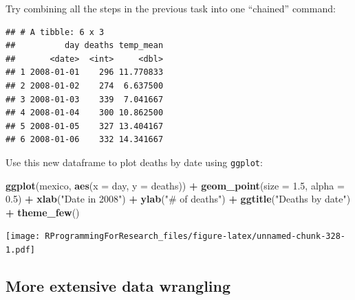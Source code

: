 \documentclass[]{book}
\makeatletter
\newenvironment{Shaded}{\begin{snugshade}}{\end{snugshade}}
\newcommand{\KeywordTok}[1]{\textcolor[rgb]{0.13,0.29,0.53}{\textbf{#1}}}
\newcommand{\DataTypeTok}[1]{\textcolor[rgb]{0.13,0.29,0.53}{#1}}
\newcommand{\FloatTok}[1]{\textcolor[rgb]{0.00,0.00,0.81}{#1}}
\newcommand{\StringTok}[1]{\textcolor[rgb]{0.31,0.60,0.02}{#1}}
\newcommand{\OperatorTok}[1]{\textcolor[rgb]{0.81,0.36,0.00}{\textbf{#1}}}
\newcommand{\NormalTok}[1]{#1}
\newenvironment{kframe}{%
\medskip{}
\setlength{\fboxsep}{.8em}
 \def\at@end@of@kframe{}%
 \ifinner\ifhmode%
  \def\at@end@of@kframe{\end{minipage}}%
  \begin{minipage}{\columnwidth}%
 \fi\fi%
 \def\FrameCommand##1{\hskip\@totalleftmargin \hskip-\fboxsep
 \colorbox{shadecolor}{##1}\hskip-\fboxsep
     \hskip-\linewidth \hskip-\@totalleftmargin \hskip\columnwidth}%
 \MakeFramed {\advance\hsize-\width
   \@totalleftmargin\z@ \linewidth\hsize
   \@setminipage}}%
 {\par\unskip\endMakeFramed%
 \at@end@of@kframe}
\renewenvironment{Shaded}{\begin{kframe}}{\end{kframe}}
\theoremstyle{definition}
\theoremstyle{definition}
\theoremstyle{definition}
\theoremstyle{remark}
\makeatother
\begin{document}
Try combining all the steps in the previous task into one ``chained''
command:

\begin{Shaded}
\end{Shaded}

\begin{verbatim}
## # A tibble: 6 x 3
##          day deaths temp_mean
##       <date>  <int>     <dbl>
## 1 2008-01-01    296 11.770833
## 2 2008-01-02    274  6.637500
## 3 2008-01-03    339  7.041667
## 4 2008-01-04    300 10.862500
## 5 2008-01-05    327 13.404167
## 6 2008-01-06    332 14.341667
\end{verbatim}

Use this new dataframe to plot deaths by date using \texttt{ggplot}:

\begin{Shaded}
\begin{Highlighting}[]
\KeywordTok{ggplot}\NormalTok{(mexico, }\KeywordTok{aes}\NormalTok{(}\DataTypeTok{x =}\NormalTok{ day, }\DataTypeTok{y =}\NormalTok{ deaths)) }\OperatorTok{+}\StringTok{ }
\StringTok{        }\KeywordTok{geom_point}\NormalTok{(}\DataTypeTok{size =} \FloatTok{1.5}\NormalTok{, }\DataTypeTok{alpha =} \FloatTok{0.5}\NormalTok{) }\OperatorTok{+}\StringTok{ }
\StringTok{        }\KeywordTok{xlab}\NormalTok{(}\StringTok{"Date in 2008"}\NormalTok{) }\OperatorTok{+}\StringTok{ }\KeywordTok{ylab}\NormalTok{(}\StringTok{"# of deaths"}\NormalTok{) }\OperatorTok{+}\StringTok{ }
\StringTok{        }\KeywordTok{ggtitle}\NormalTok{(}\StringTok{"Deaths by date"}\NormalTok{) }\OperatorTok{+}\StringTok{ }
\StringTok{        }\KeywordTok{theme_few}\NormalTok{()}
\end{Highlighting}
\end{Shaded}

\texttt{[image: RProgrammingForResearch\_files/figure-latex/unnamed-chunk-328-1.pdf]}

\subsection{More extensive data
wrangling}\label{more-extensive-data-wrangling}
\end{document}
